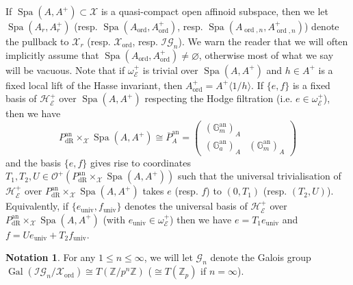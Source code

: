 \documentclass[10pt, oneside]{amsart}
\DeclareMathOperator{\Gal}{Gal}
\numberwithin{equation}{subsection}
\theoremstyle{definition}
\newtheorem{notation}[equation]{Notation}
\theoremstyle{remark}
\newcommand{\mbb}[1]{\mathbb{#1}}
\newcommand{\opn}[1]{\operatorname{#1}}
\newcommand{\tbyt}[4]{\left( \begin{matrix} #1 & #2 \\ #3 & #4 \end{matrix} \right)}
\begin{document}
If $\opn{Spa}(A, A^+) \subset \mathcal{X}$ is a quasi-compact open affinoid subspace, then we let $\opn{Spa}(A_r, A_r^+)$ (resp. $\opn{Spa}(A_{\opn{ord}}, A_{\opn{ord}}^+)$, resp. $\opn{Spa}(A_{\opn{ord}, n}, A_{\opn{ord}, n}^+)$) denote the pullback to $\mathcal{X}_r$ (resp. $\mathcal{X}_{\opn{ord}}$, resp. $\mathcal{IG}_n$). We warn the reader that we will often implicitly assume that $\opn{Spa}(A_{\opn{ord}}, A_{\opn{ord}}^+) \neq \varnothing$, otherwise most of what we say will be vacuous. Note that if $\omega_{\mathcal{E}}^+$ is trivial over $\opn{Spa}(A, A^+)$ and $h \in A^+$ is a fixed local lift of the Hasse invariant, then $A_{\opn{ord}}^+ = A^+\langle 1/h \rangle$. If $\{e, f\}$ is a fixed basis of $\mathcal{H}_{\mathcal{E}}^+$ over $\opn{Spa}(A, A^+)$ respecting the Hodge filtration (i.e. $e \in \omega_{\mathcal{E}}^+$), then we have 
\[
P_{\opn{dR}}^{\opn{an}} \times_{\mathcal{X}} \opn{Spa}(A, A^+) \cong \overline{P}^{\opn{an}}_{A} = \tbyt{(\mbb{G}_m^{\opn{an}})_{A}}{}{(\mbb{G}_a^{\opn{an}})_{A}}{(\mbb{G}_m^{\opn{an}})_{A}}
\]
and the basis $\{e, f\}$ gives rise to coordinates $T_1, T_2, U \in \mathcal{O}^+(P_{\opn{dR}}^{\opn{an}} \times_{\mathcal{X}} \opn{Spa}(A, A^+))$ such that the universal trivialisation of $\mathcal{H}_{\mathcal{E}}^+$ over $P_{\opn{dR}}^{\opn{an}} \times_{\mathcal{X}} \opn{Spa}(A, A^+)$ takes $e$ (resp. $f$) to $(0, T_1)$ (resp. $(T_2, U)$). Equivalently, if $\{ e_{\opn{univ}}, f_{\opn{univ}} \}$ denotes the universal basis of $\mathcal{H}^+_{\mathcal{E}}$ over $P_{\opn{dR}}^{\opn{an}} \times_{\mathcal{X}} \opn{Spa}(A, A^+)$ (with $e_{\opn{univ}} \in \omega_{\mathcal{E}}^+$) then we have $e = T_1 e_{\opn{univ}}$ and $f = U e_{\opn{univ}} + T_2 f_{\opn{univ}}$.

\begin{notation}
For any $1 \leq n \leq \infty$, we will let $\mathscr{G}_n$ denote the Galois group $\Gal(\mathcal{IG}_{n}/\mathcal{X}_{\opn{ord}}) \cong T\left(\mbb{Z}/p^n \mbb{Z} \right)$ ($\cong T(\mbb{Z}_p)$ if $n=\infty$). 
\end{notation}
\end{document}
